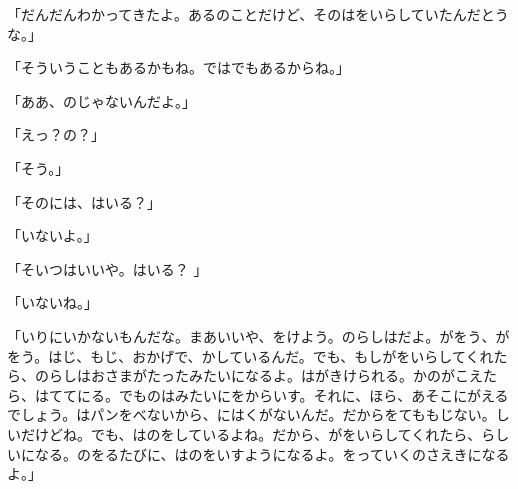 「だんだんわかってきたよ。あるのことだけど、そのはをいらしていたんだとうな。」

「そういうこともあるかもね。ではでもあるからね。」

「ああ、のじゃないんだよ。」

「えっ？の？」

「そう。」

「そのには、はいる？」

「いないよ。」

「そいつはいいや。はいる？ 」

「いないね。」

「いりにいかないもんだな。まあいいや、をけよう。のらしはだよ。がをう、がをう。はじ、もじ、おかげで、かしているんだ。でも、もしがをいらしてくれたら、のらしはおさまがたったみたいになるよ。はがきけられる。かのがこえたら、はててにる。でものはみたいにをからいす。それに、ほら、あそこにがえるでしょう。はパンをべないから、にはくがないんだ。だからをてももじない。しいだけどね。でも、はのをしているよね。だから、がをいらしてくれたら、らしいになる。のをるたびに、はのをいすようになるよ。をっていくのさえきになるよ。」


